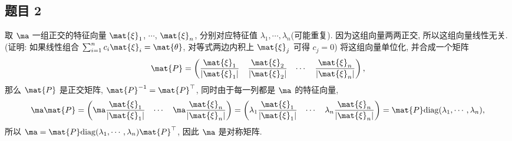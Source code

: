 \newpage
\subsection*{ 题目 2 }
\begin{solution}
取 $\ma$ 一组正交的特征向量 $\mat{\xi}_1$, $\cdots$, $\mat{\xi}_n$, 分别对应特征值 $\lambda_1, \cdots, \lambda_n$(可能重复). 因为这组向量两两正交, 所以这组向量线性无关. (证明: 如果线性组合 $\sum_{i = 1}^n c_i \mat{\xi}_i = \mat{\theta}$, 对等式两边内积上 $\mat{\xi}_j$ 可得 $c_j = 0$) 将这组向量单位化, 并合成一个矩阵
\[
\mat{P} = \begin{pmatrix}
    \dfrac{\mat{\xi}_1}{|\mat{\xi}_1|} & \dfrac{\mat{\xi}_2}{|\mat{\xi}_2|} & \cdots & \dfrac{\mat{\xi}_n}{|\mat{\xi}_n|}
\end{pmatrix},
\]
那么 $\mat{P}$ 是正交矩阵, $\mat{P}^{-1} = \mat{P}^{\top}$, 同时由于每一列都是 $\ma$ 的特征向量,
\[
    \ma \mat{P} = \begin{pmatrix}
        \ma \dfrac{\mat{\xi}_1}{|\mat{\xi}_1|} & \cdots & \ma \dfrac{\mat{\xi}_n}{|\mat{\xi}_n|}
    \end{pmatrix}
    = \begin{pmatrix}
        \lambda_1 \dfrac{\mat{\xi}_1}{|\mat{\xi}_1|} & \cdots & \lambda_n \dfrac{\mat{\xi}_n}{|\mat{\xi}_n|}
    \end{pmatrix}
    = \mat{P} \mathrm{diag}(\lambda_1, \cdots, \lambda_n),
\]
所以 $\ma = \mat{P} \mathrm{diag}(\lambda_1, \cdots, \lambda_n) \mat{P}^{\top}$, 因此 $\ma$ 是对称矩阵.
\end{solution}


